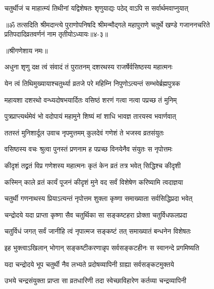 \twolineshloka
{चतुर्थीजं च माहात्म्यं तिथीनां यद्विशेषतः}
{श‍ृणुयाद्यः पठेद् वाऽपि स सर्वार्थमवाप्नुयात्} %

॥ॐ तत्सदिति श्रीमदान्त्ये पुराणोपनिषदि श्रीमन्मौद्गले महापुराणे चतुर्थे खण्डे गजाननचरिते प्रतिपदादिव्रतवर्णनं नाम तृतीयोऽध्यायः॥४-३॥


\label{sec:dasharatha-vratopadeshah}

\centerline{॥श्रीगणेशाय नमः॥}


\twolineshloka
{अधुना श‍ृणु दक्ष त्वं संवादं तं पुरातनम्}
{दशरथस्य राजर्षेर्वसिष्ठस्य महात्मनः} %

\twolineshloka
{येन त्वं तिथिमुख्यायाश्चतुर्थ्या व्रतजे परे}
{महिम्नि निपुणोऽत्यन्तं सम्भवेर्ब्रह्मपुत्रक} %

\twolineshloka
{महायशा दशरथो वन्ध्यदोषभयार्दितः}
{वसिष्ठं शरणं गत्वा नत्वा पप्रच्छ तं मुनिम्} %


\twolineshloka
{पुत्रप्राप्त्यर्थमेवं भो वदोपायं महामुने}
{शिष्यं मां शाधि भावज्ञ तारयस्व भवार्णवात्} %

\twolineshloka
{ततस्तं मुनिशार्दूल उवाच नृपमुत्तमम्}
{कुलदेवं गणेशं ते भजस्व व्रतसंयुतः} %

\twolineshloka
{वसिष्ठस्य वचः श्रुत्वा पुनस्तं प्रणनाम ह}
{पप्रच्छ विनयेनैव संयुतः स नृपोत्तमः} %

\twolineshloka
{कीदृशं तद्व्रतं विप्र गणेशस्य महात्मनः}
{कृतं केन व्रतं तत्र भवेत् सिद्धिश्च कीदृशी} %

\twolineshloka
{कस्मिन् काले व्रतं कार्यं पूजनं कीदृशं मुने}
{वद सर्वं विशेषेण करिष्यामि त्वदाज्ञया} %


\twolineshloka
{चतुर्थी गणनाथस्य प्रियाऽत्यन्तं नृपोत्तम}
{शुक्ला कृष्णा समाख्याता सर्वसिद्धिप्रदा भवेत्} %

\twolineshloka
{चन्द्रोदये यदा प्राप्ता कृष्णा सैव चतुर्थिका}
{सा सङ्कष्टहरा प्रोक्ता चतुर्विधफलप्रदा} %

\twolineshloka
{चतुर्विधं जगत् सर्वं जानीहि त्वं नृपात्मज}
{सङ्कष्टं तत् समाख्यातं बन्धनेन विशेषतः} %

\twolineshloka
{इह भुक्त्वाऽखिलान् भोगान् सङ्कष्टीकरणान्नृप}
{सर्वसङ्कटहीनः स स्वानन्दे प्रगमिष्यति} %

\twolineshloka
{यदा चन्द्रोदये भूप चतुर्थी नैव लभ्यते}
{प्रदोषव्यापिनी ग्राह्या सर्वसङ्कटमुक्तये} %

\twolineshloka
{उभये चन्द्रसंयुक्ता प्राप्ता सा व्रतधारिणी}
{तदा स्वेच्छाविहारेण कर्तव्या चन्द्रव्यापिनी} %

